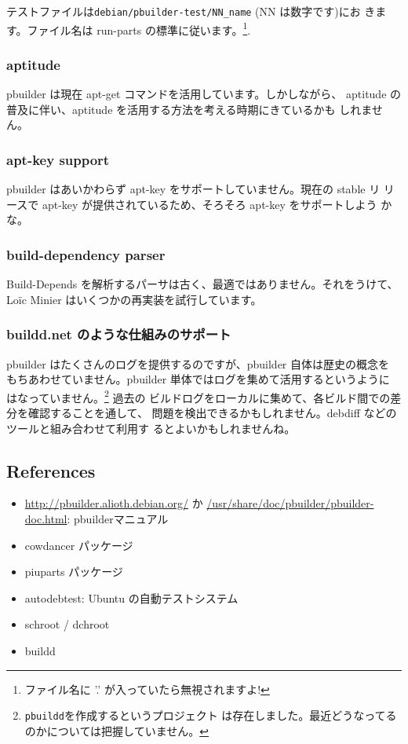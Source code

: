 \documentclass[mingoth,a4paper]{jsarticle}
\begin{document}
テストファイルは\verb!debian/pbuilder-test/NN_name! (NN は数字です)にお
きます。ファイル名は run-parts の標準に従います。\footnote{ファイル名に 
'.' が入っていたら無視されますよ!}.

\subsubsection{aptitude}

pbuilder は現在 apt-get コマンドを活用しています。しかしながら、 
aptitude の普及に伴い、aptitude を活用する方法を考える時期にきているかも
しれません。

\subsubsection{apt-key support}

pbuilder はあいかわらず apt-key をサポートしていません。現在の stable リ
リースで apt-key が提供されているため、そろそろ apt-key をサポートしよう
かな。

\subsubsection{build-dependency parser}

Build-Depends を解析するパーサは古く、最適ではありません。それをうけて、
Lo\"ic Minier はいくつかの再実装を試行しています。

\subsubsection{buildd.net のような仕組みのサポート}

pbuilder はたくさんのログを提供するのですが、pbuilder 自体は歴史の概念を
もちあわせていません。pbuilder 単体ではログを集めて活用するというように
はなっていません。\footnote{\texttt{pbuildd}を作成するというプロジェクト
は存在しました。最近どうなってるのかについては把握していません。} 過去の
ビルドログをローカルに集めて、各ビルド間での差分を確認することを通して、
問題を検出できるかもしれません。debdiff などのツールと組み合わせて利用す
るとよいかもしれませんね。


\subsection{References}

\begin{itemize}
 \item \url{http://pbuilder.alioth.debian.org/} か
 \url{/usr/share/doc/pbuilder/pbuilder-doc.html}: pbuilderマニュアル
 \item cowdancer パッケージ
 \item piuparts パッケージ
 \item autodebtest: Ubuntu の自動テストシステム
 \item schroot / dchroot 
 \item buildd
\end{itemize}
\end{document}
